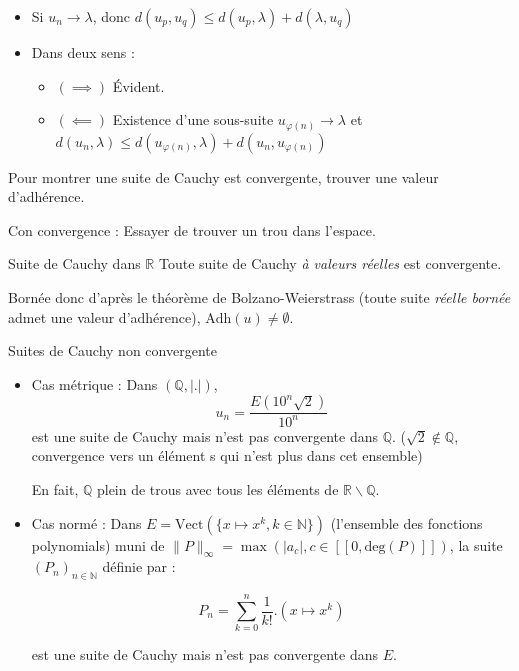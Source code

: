 \begin{myproof}
\begin{itemize}
    \item Si $u_n \to \lambda$, donc $d(u_p, u_q) \le d(u_p, \lambda) + d(\lambda, u_q)$
    \item Dans deux sens :
        \begin{itemize}
            \item  $(\implies)$ Évident.
            \item $(\impliedby)$ Existence d'une sous-suite $u_{\varphi(n)}\to \lambda$ et $d(u_n,\lambda) \le d(u_{\varphi(n)}, \lambda) + d(u_n,u_{\varphi(n)})$
        \end{itemize}
\end{itemize}
\end{myproof}

\begin{note}
Pour montrer une suite de Cauchy est convergente, trouver une valeur d'adhérence.

Con convergence : Essayer de trouver un trou dans l'espace.
\end{note}
\begin{Prop}{Suite de Cauchy dans $\mathbb{R}$}{}
Toute suite de Cauchy \textit{à valeurs réelles} est convergente.
\end{Prop}
\begin{myproof}
Bornée donc d'après le théorème de Bolzano-Weierstrass (toute suite \textit{réelle bornée} admet une valeur d'adhérence), $\mathrm{Adh} (u) \ne \emptyset$.
\end{myproof}

\begin{Example}{Suites de Cauchy non convergente}{}
\begin{itemize}
    \item Cas métrique : Dans $(\mathbb{Q}, |.|)$, $$u_n = \frac{E(10^{n}\sqrt{2} )}{10^{n}}$$ est une suite de Cauchy mais n'est pas convergente dans $\mathbb{Q}$. ($\sqrt{2} \not\in \mathbb{Q} $, convergence vers un élément s qui n'est plus dans cet ensemble)

        En fait, $\mathbb{Q} $ plein de trous avec tous les éléments de $\mathbb{R} \backslash \mathbb{Q} $.

      \item Cas normé : Dans $E = \mathrm{Vect} (\{x \mapsto x^{k}, k \in\mathbb{N} \})$ (l'ensemble des fonctions polynomials) muni de $\|P\|_{\infty}= \max(|a_c|, c\in [\![0, \mathrm{deg}(P)]\!])$, la suite $(P_n)_{n\in\mathbb{N} }$ définie par :

        \[
        P_n = \sum_{k=0}^{n} \frac{1}{k!} . (x \mapsto x^{k})
        \]
        
    est une suite de Cauchy mais n'est pas convergente dans $E$.
        
\end{itemize}
\end{Example}

